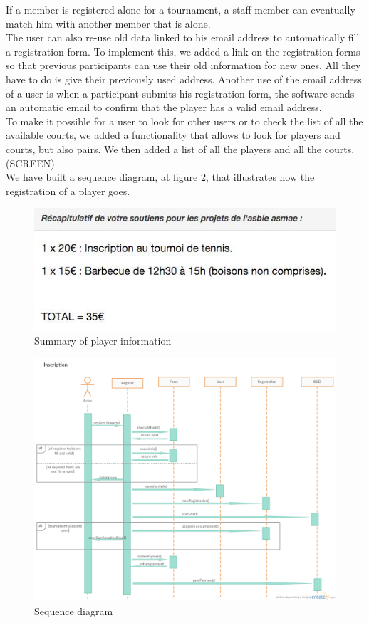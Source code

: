 \documentclass[a4paper, 12pt]{article}
\begin{document}
If a member is registered alone for a tournament, a staff member can eventually match him with another member that is alone.\\

The user can also re-use old data linked to his email address to automatically fill a registration form. To implement this, we added a link on the registration forms so that previous participants can use their old information for new ones. All they have to do is give  their previously used address. Another use of the email address of a user is when a participant submits his registration form, the software sends an automatic email to confirm that the player has a valid email address.\\

To make it possible for a user to look for other users or to check the list of all the available courts, we added a functionality that allows to look for players and courts, but also pairs. We then added a list of all the players and all the courts.(SCREEN)\\

We have built a sequence diagram, at figure \ref{playerseq}, that illustrates how the registration of a player goes.\\
\begin{figure}[h]
  \caption{\label{recap} Summary of player information}
  \includegraphics[scale=0.7]{recap.png}
\end{figure}

\begin{figure}

   \caption{\label{playerseq} Sequence diagram}
  \includegraphics[scale=0.4]{Inscription.png}
\end{figure}
\FloatBarrier
\newpage
\end{document}
